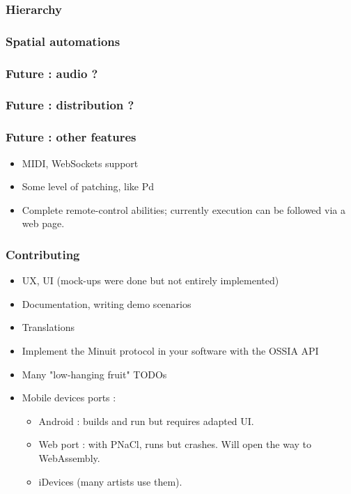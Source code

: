 \documentclass{beamer}
\begin{document}
    \begin{frame}
        \frametitle{Hierarchy}
        
    \end{frame}
    
    \begin{frame}
        \frametitle{Spatial automations}
        
    \end{frame}
    
    \begin{frame}
        \frametitle{Future : audio ?}
        
    \end{frame}

\begin{frame}
    \frametitle{Future : distribution ?}
    
\end{frame}

\begin{frame}
    \frametitle{Future : other features}
    
    \begin{itemize}
    \item MIDI, WebSockets support
    \item Some level of patching, like Pd
    \item Complete remote-control abilities; currently execution can be followed via a web page.
    \end{itemize}
\end{frame}

\begin{frame}
    \frametitle{Contributing}    
    \begin{itemize}
    \item UX, UI (mock-ups were done but not entirely implemented)
    \item Documentation, writing demo scenarios
    \item Translations    
    \item Implement the Minuit protocol in your software with the OSSIA API    
    \item Many "low-hanging fruit" TODOs
    \item Mobile devices ports : 
    \begin{itemize}
        \item Android : builds and run but requires adapted UI.
        \item Web port : with PNaCl, runs but crashes. Will open the way to WebAssembly. 
        \item iDevices (many artists use them).
    \end{itemize}
\end{itemize}
    
\end{frame}
\end{document}
